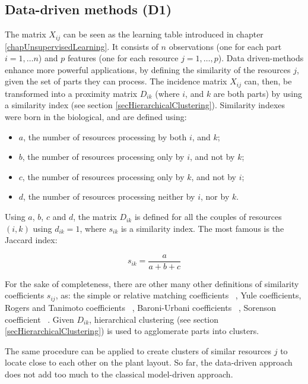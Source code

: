 \subsection{Data-driven methods (D1)}

The matrix $X_{ij}$ can be seen as the learning table introduced in chapter \ref{chapUnsupervisedLearning}. It consists of $n$ observations (one for each part $i=1,\ldots n$) and $p$ features (one for each resource $j=1,\ldots,p$). Data driven-methods enhance more powerful applications, by defining the similarity of the resources $j$, given the set of parts they can process. The incidence matrix $X_{ij}$ can, then, be transformed into a proximity matrix $D_{ik}$ (where $i$, and $k$ are both parts) by using a similarity index (see section \ref{secHierarchicalClustering}). Similarity indexes were born in the biological, and are defined using:

\begin{itemize}
    \item $a$, the number of resources processing by both $i$, and $k$;
	\item $b$, the number of resources processing only by $i$, and not by $k$;
	\item $c$, the number of resources processing only by $k$, and not by $i$;
	\item $d$, the number of resources processing neither by $i$, nor by $k$.

\end{itemize}

Using $a$, $b$, $c$ and $d$, the matrix $D_{ik}$ is defined for all the couples of resources $(i,k)$ using $d_{ik}=1$, where $s_{ik}$ is a similarity index. The most famous is the Jaccard index:

\begin{equation}
    s_{ik}=\frac{a}{a+b+c}
\end{equation}

For the sake of completeness, there are other many other definitions of similarity coefficients $s_{ij}$, as: the simple or relative matching coefficients ~\cite{Heltshe1988}, Yule coefficients, Rogers and Tanimoto coefficients ~\cite{Jackson1989}, Baroni-Urbani coefficients ~\cite{Buser1976}, Sorenson coefficient ~\cite{Yin2005}. Given $D_{ik}$, hierarchical clustering (see section \ref{secHierarchicalClustering}) is used to agglomerate parts into clusters.\par

The same procedure can be applied to create clusters of similar resources $j$ to locate close to each other on the plant layout. So far, the data-driven approach does not add too much to the classical model-driven approach.\par

